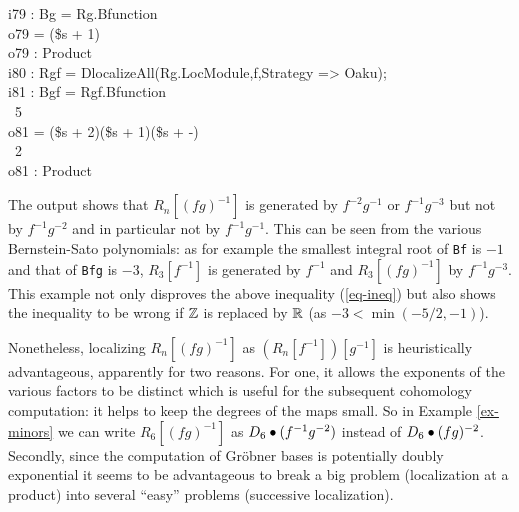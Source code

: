 \begin{remark}
\endOutput
\beginOutput
i79 : Bg = Rg.Bfunction\\
\emptyLine
o79 = (\$s + 1)\\
\emptyLine
o79 : Product\\
\endOutput
\beginOutput
i80 : Rgf = DlocalizeAll(Rg.LocModule,f,Strategy => Oaku);\\
\endOutput
\beginOutput
i81 : Bgf = Rgf.Bfunction\\
\emptyLine
\                            5\\
o81 = (\$s + 2)(\$s + 1)(\$s + -)\\
\                            2\\
\emptyLine
o81 : Product\\
\endOutput

The output shows
that $R_n[(fg)^{-1}]$ is generated by $f^{-2}g^{-1}$ or $f^{-1}g^{-3}$ but not
by $f^{-1}g^{-2}$ and in particular not by $f^{-1}g^{-1}$. 
This can be seen from the various Bernstein-Sato polynomials: as for
example the smallest integral root of {\tt Bf} is $-1$ and that of
{\tt Bfg} is $-3$, $R_3[f^{-1}]$ is generated by $f^{-1}$ and
$R_3[(fg)^{-1}]$ by $f^{-1}g^{-3}$.
This example not only disproves the above inequality (\ref{eq-ineq})
but also shows
the inequality to be wrong if ${\mathbb Z}$ is replaced by ${\mathbb R}$ (as
$-3<\min(-5/2,-1)$). 
\end{remark}


Nonetheless, localizing $R_n[(fg)^{-1}]$ as $(R_n[f^{-1}])[g^{-1}]$ is
heuristically advantageous, apparently for two reasons. For 
one, it allows the exponents of the various factors to be distinct
which is useful for the subsequent cohomology computation: it helps
to keep the degrees of the maps small. So in
Example \ref{ex-minors} we can write $R_6[(fg)^{-1}]$ as $D_6\bullet 
(f^{-1} g^{-2})$ instead
of $D_6\bullet (fg)^{-2}$. 
Secondly,  
since the computation of Gr\"obner bases is potentially 
doubly exponential it
seems to be advantageous to break a big problem (localization at a
product) into several ``easy'' problems (successive localization).

